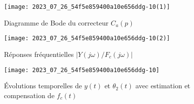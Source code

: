 \ifprof
\else
\begin{figure}[!h]
\centering
\texttt{[image: 2023\_07\_26\_54f5e859400a10e656ddg-10(1)]}
\caption{\label{fig_ccspsi2022:16}Diagramme de Bode du correcteur $C_{a}(p)$}
\end{figure}


\begin{figure}[!h]
\centering
\texttt{[image: 2023\_07\_26\_54f5e859400a10e656ddg-10(2)]}
\caption{\label{fig_ccspsi2022:17}Réponses fréquentielles $\left|Y(j \omega) / F_{c}(j \omega)\right|$}
\end{figure}


\begin{figure}[!h]
\centering
\texttt{[image: 2023\_07\_26\_54f5e859400a10e656ddg-10]}
\caption{\label{fig_ccspsi2022:18}Évolutions temporelles de $y(t)$ et $\theta_{2}(t)$ avec estimation et compensation de $f_{c}(t)$}
\end{figure}
\fi

%